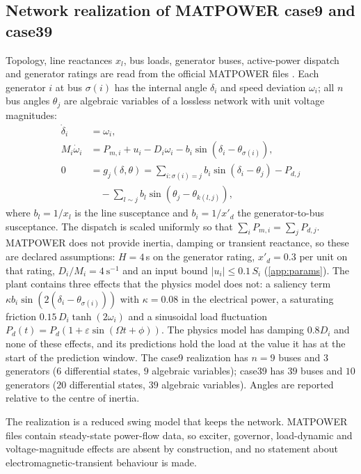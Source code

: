 \documentclass[preprint,12pt]{elsarticle}
\begin{document}
\subsection{Network realization of MATPOWER case9 and case39}
\label{sec:network}
Topology, line reactances $x_l$, bus loads, generator buses, active-power dispatch and generator ratings are read from the official MATPOWER files \cite{matpower,matpowerdata}. Each generator $i$ at bus $\sigma(i)$ has the internal angle $\delta_i$ and speed deviation $\omega_i$; all $n$ bus angles $\theta_j$ are algebraic variables of a lossless network with unit voltage magnitudes:
\begin{align}
\dot\delta_i &= \omega_i,\nonumber\\ M_i\dot\omega_i &= P_{m,i} + u_i - D_i\omega_i - b_i\sin(\delta_i-\theta_{\sigma(i)}), \label{eq:n1}\\
0 &= g_j(\delta,\theta) = \sum_{i:\sigma(i)=j} b_i\sin(\delta_i-\theta_j) - P_{d,j} \nonumber\\ &\quad - \sum_{l\sim j} b_l\sin(\theta_j-\theta_{k(l,j)}), \label{eq:n2}
\end{align}
where $b_l=1/x_l$ is the line susceptance and $b_i=1/x'_{d}$ the generator-to-bus susceptance. The dispatch is scaled uniformly so that $\sum_i P_{m,i}=\sum_j P_{d,j}$. MATPOWER does not provide inertia, damping or transient reactance, so these are declared assumptions: $H=4$\,s on the generator rating, $x'_d=0.3$ per unit on that rating, $D_i/M_i=4\ \mathrm{s}^{-1}$ and an input bound $|u_i|\le 0.1\,S_i$ (\ref{app:params}). The plant contains three effects that the physics model does not: a saliency term $\kappa b_i\sin(2(\delta_i-\theta_{\sigma(i)}))$ with $\kappa=0.08$ in the electrical power, a saturating friction $0.15\,D_i\tanh(2\omega_i)$ and a sinusoidal load fluctuation $P_d(t)=P_d(1+\varepsilon\sin(\Omega t+\phi))$. The physics model has damping $0.8D_i$ and none of these effects, and its predictions hold the load at the value it has at the start of the prediction window. The case9 realization has $n=9$ buses and $3$ generators ($6$ differential states, $9$ algebraic variables); case39 has $39$ buses and $10$ generators ($20$ differential states, $39$ algebraic variables). Angles are reported relative to the centre of inertia.

The realization is a reduced swing model that keeps the network. MATPOWER files contain steady-state power-flow data, so exciter, governor, load-dynamic and voltage-magnitude effects are absent by construction, and no statement about electromagnetic-transient behaviour is made.
\end{document}
